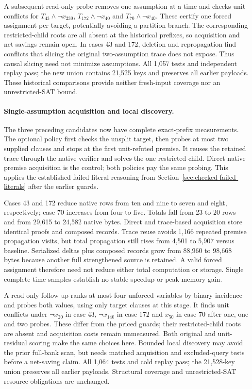 \documentclass[11pt,a4paper]{article}
\numberwithin{equation}{section}
\theoremstyle{plain}
\theoremstyle{definition}
\theoremstyle{remark}
\begin{document}
A subsequent read-only probe removes one assumption at a time and checks unit
conflicts for $T_{43}\land\neg x_{230}$, $T_{172}\land\neg x_{40}$ and
$T_{70}\land\neg x_{40}$. These certify one forced assignment per target, potentially
avoiding a partition branch. The corresponding restricted-child roots are all
absent at the historical prefixes, so acquisition and net savings remain open.
In cases 43 and 172, deletion and repropagation find conflicts that slicing the
original two-assumption trace does not expose. Thus causal slicing need not
minimize assumptions. All 1,057 tests and independent replay pass; the new union
contains 21,525 keys and preserves all earlier payloads. These historical
comparisons provide neither fresh-input coverage nor an unrestricted-SAT bound.

\paragraph{Single-assumption acquisition and local discovery.}
The three preceding candidates now have complete exact-prefix measurements.
The optional policy first checks the unsplit target, then probes at most two
supplied clauses and stops at the first unit-refuted premise. It reuses the
retained trace through the native verifier and solves the one restricted child.
Direct native premise acquisition is the control; both policies pay the same
probing. This applies the established failed-literal reasoning from
Section~\ref{sec:checked-failed-literals} after the earlier guards.

Cases 43 and 172 reduce native rows from ten and nine to seven and eight,
respectively; case 70 increases from four to five. Totals fall from 23 to 20
rows and from 29,615 to 24,582 native bytes. Direct and trace-based acquisition
store identical proofs and composed records. Trace reuse avoids 1,166 repeated
premise propagation visits, but total propagation still rises from 4,501 to
5,907 versus baseline. Serialized deltas plus composed records grow from 88,960
to 98,668 bytes because another full strengthened source is retained. A valid
forced assignment therefore need not reduce either total computation or storage.
Single complete-time samples establish no stable speedup or peak-memory gain.

A read-only follow-up ranks at most four unforced variables by binary incidence
and probes both values, using only target clauses at this stage. It finds unit
conflicts under $\neg x_{20}$ in case 43, $\neg x_{140}$ in case 172 and $x_{50}$
in case 70 after one, one and two probes. These differ from the priced guards;
their restricted-child roots are absent and acquisition costs remain unmeasured.
Both original and unit-residual scoring make the same choices here. Bounded
local discovery may avoid the prior full-bank scan, but needs matched acquisition
and excluded-query tests before a net-saving claim. All 1,064 tests and cold
replay pass; the 21,528-key union preserves all earlier payloads. Structural
coverage and unrestricted-SAT resource obligations are unchanged.
\end{document}
